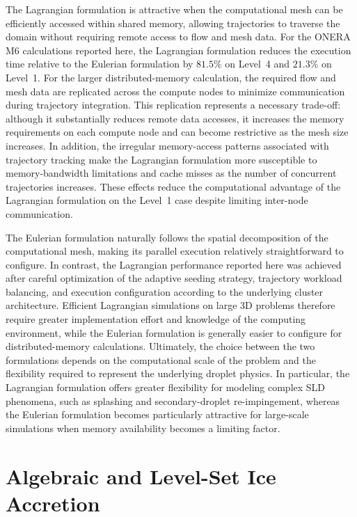 The Lagrangian formulation is attractive when the computational mesh can be efficiently accessed within shared memory, allowing trajectories to traverse the domain without requiring remote access to flow and mesh data. For the ONERA M6 calculations reported here, the Lagrangian formulation reduces the execution time relative to the Eulerian formulation by $81.5\%$ on Level~4 and $21.3\%$ on Level~1. For the larger distributed-memory calculation, the required flow and mesh data are replicated across the compute nodes to minimize communication during trajectory integration. This replication represents a necessary trade-off: although it substantially reduces remote data accesses, it increases the memory requirements on each compute node and can become restrictive as the mesh size increases. In addition, the irregular memory-access patterns associated with trajectory tracking make the Lagrangian formulation more susceptible to memory-bandwidth limitations and cache misses as the number of concurrent trajectories increases. These effects reduce the computational advantage of the Lagrangian formulation on the Level~1 case despite limiting inter-node communication.

The Eulerian formulation naturally follows the spatial decomposition of the computational mesh, making its parallel execution relatively straightforward to configure. In contrast, the Lagrangian performance reported here was achieved after careful optimization of the adaptive seeding strategy, trajectory workload balancing, and execution configuration according to the underlying cluster architecture. Efficient Lagrangian simulations on large 3D problems therefore require greater implementation effort and knowledge of the computing environment, while the Eulerian formulation is generally easier to configure for distributed-memory calculations. Ultimately, the choice between the two formulations depends on the computational scale of the problem and the flexibility required to represent the underlying droplet physics. In particular, the Lagrangian formulation offers greater flexibility for modeling complex SLD phenomena, such as splashing and secondary-droplet re-impingement, whereas the Eulerian formulation becomes particularly attractive for large-scale simulations when memory availability becomes a limiting factor.

\section{Algebraic and Level-Set Ice Accretion}

